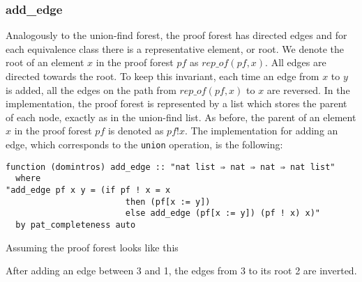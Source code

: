 \subsubsection{add\_edge}
\label{subsubsection:addedge}

Analogously to the union-find forest, the proof forest has directed edges and for each equivalence class there is a representative element, or root. We denote the root of an element $x$ in the proof forest $pf$ as $rep\_of(pf, x)$. All edges are directed towards the root. To keep this invariant, each time an edge from $x$ to $y$ is added, all the edges on the path from $rep\_of(pf, x)$ to $x$ are reversed.
In the implementation, the proof forest is represented by a list which stores the parent of each node, exactly as in the union-find list. As before, the parent of an element $x$ in the proof forest $pf$ is denoted as $pf ! x$. The implementation for adding an edge, which corresponds to the \lstinline{union} operation, is the following:

\begin{lstlisting}
function (domintros) add_edge :: "nat list ⇒ nat ⇒ nat ⇒ nat list"
  where
"add_edge pf x y = (if pf ! x = x
                        then (pf[x := y])
                        else add_edge (pf[x := y]) (pf ! x) x)"
  by pat_completeness auto
\end{lstlisting}

\begin{exmp}
Assuming the proof forest looks like this

\begin{center}
\end{center}


After adding an edge between 3 and 1, the edges from 3 to its root 2 are inverted.

\begin{center}
\end{center}
\end{exmp}

